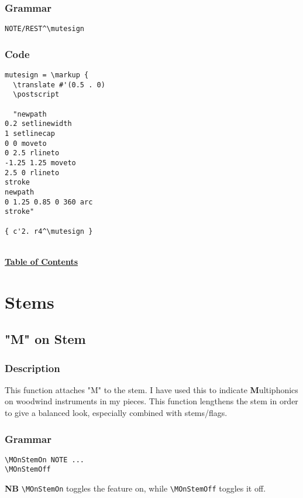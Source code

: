 \documentclass[11pt, oneside]{book}   	%
\begin{document}
\subsection{Grammar}
\begin{verbatim}
NOTE/REST^\mutesign
\end{verbatim}
\subsection{Code}
\begin{verbatim}
mutesign = \markup {
  \translate #'(0.5 . 0)
  \postscript

  "newpath
0.2 setlinewidth
1 setlinecap
0 0 moveto
0 2.5 rlineto
-1.25 1.25 moveto
2.5 0 rlineto
stroke
newpath
0 1.25 0.85 0 360 arc
stroke"

{ c'2. r4^\mutesign }

\end{verbatim}
\hyperref[sec:toc]{\\ \textbf{Table of Contents}}

\vfill \break






\chapter {Stems}


\section {"M" on Stem}
\hfill

\subsection{Description}
This function attaches "M" to the stem. I have used this to indicate \textbf{M}ultiphonics on woodwind instruments in my pieces. This function lengthens the stem in order to give a balanced look, especially combined with stems/flags. 
\subsection{Grammar}
\begin{verbatim}
\MOnStemOn NOTE ...
\MOnStemOff
\end{verbatim}
\textbf{NB} \verb |\MOnStemOn| toggles the feature on, while \verb|\MOnStemOff| toggles it off.
\end{document}
